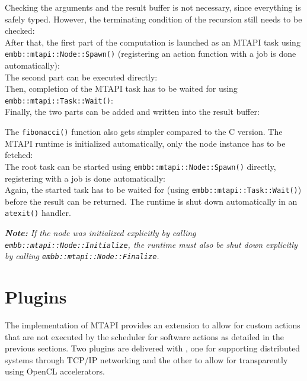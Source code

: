 Checking the arguments and the result buffer is not necessary, since everything is safely typed. However, the terminating condition of the recursion still needs to be checked:
%
\\
%
After that, the first part of the computation is launched as an MTAPI task using \lstinline|embb::mtapi::Node::Spawn()| (registering an action function with a job is done automatically):
%
\\
%
The second part can be executed directly:
%
\\
%
Then, completion of the MTAPI task has to be waited for using \lstinline|embb::mtapi::Task::Wait()|:
%
\\
%
Finally, the two parts can be added and written into the result buffer:
%
\\
% 

The \lstinline|fibonacci()| function also gets simpler compared to the C version. The MTAPI runtime is initialized automatically, only the node instance has to be fetched:
%
\\
%
The root task can be started using \lstinline|embb::mtapi::Node::Spawn()| directly, registering with a job is done automatically:
%
\\
%
Again, the started task has to be waited for (using \lstinline|embb::mtapi::Task::Wait()|) before the result can be returned. The runtime is shut down automatically in an \lstinline|atexit()| handler.

\emph{\textbf{Note:} If the node was initialized explicitly by calling \lstinline|embb::mtapi::Node::Initialize|, the runtime must also be shut down explicitly by calling \lstinline|embb::mtapi::Node::Finalize|.}

\section{Plugins}

The \embb implementation of MTAPI provides an extension to allow for custom actions that are not executed by the scheduler for software actions as detailed in the previous sections.
Two plugins are delivered with \embb, one for supporting distributed systems through TCP/IP networking and the other to allow for transparently using OpenCL accelerators.

